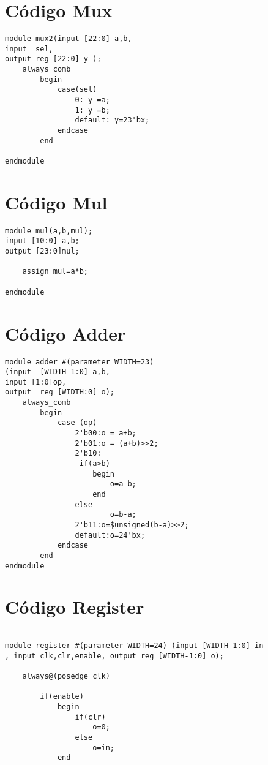 \section{Código Mux}
\label{codemux}
\begin{lstlisting}[style={verilog-style}]
module mux2(input [22:0] a,b,
input  sel, 
output reg [22:0] y );
	always_comb 
 		begin                 
			case(sel)    
				0: y =a;
				1: y =b;
				default: y=23'bx;
			endcase
		end

endmodule

\end{lstlisting}

\section{Código Mul}
\label{codemul}
\begin{lstlisting}[style={verilog-style}]
module mul(a,b,mul);
input [10:0] a,b;
output [23:0]mul;

	assign mul=a*b;

endmodule
\end{lstlisting}

\section{Código Adder}
\label{codeadder}
\begin{lstlisting}[style={verilog-style}]
module adder #(parameter WIDTH=23)
(input  [WIDTH-1:0] a,b,
input [1:0]op,
output  reg [WIDTH:0] o);
	always_comb
		begin
			case (op)
				2'b00:o = a+b;
				2'b01:o = (a+b)>>2;
				2'b10: 
				 if(a>b)
					begin
						o=a-b;
					end
				else
						o=b-a;
				2'b11:o=$unsigned(b-a)>>2;
				default:o=24'bx;
			endcase
		end
endmodule

\end{lstlisting}

\section{Código Register}
\label{coderegister}
\begin{lstlisting}[style={verilog-style}]

module register #(parameter WIDTH=24) (input [WIDTH-1:0] in
, input clk,clr,enable, output reg [WIDTH-1:0] o);

	always@(posedge clk)

		if(enable)
			begin
				if(clr)
					o=0;
				else 
					o=in;
			end
\end{lstlisting}

